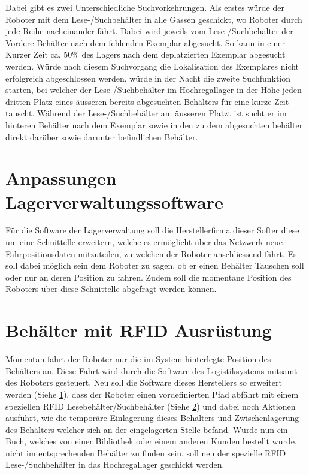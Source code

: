 Dabei gibt es zwei Unterschiedliche Suchvorkehrungen. Als erstes würde der Roboter mit dem Lese-/Suchbehälter in alle Gassen geschickt, wo Roboter durch jede Reihe nacheinander fährt. Dabei wird jeweils vom Lese-/Suchbehälter der Vordere Behälter nach dem fehlenden Exemplar abgesucht. So kann in einer Kurzer Zeit ca. 50\% des Lagers nach dem deplatzierten Exemplar abgesucht werden. Würde nach diesem Suchvorgang die Lokalisation des Exemplares nicht erfolgreich abgeschlossen werden, würde in der Nacht die zweite Suchfunktion starten, bei welcher der Lese-/Suchbehälter im Hochregallager in der Höhe jeden dritten Platz eines äusseren bereits abgesuchten Behälters für eine kurze Zeit tauscht. Während der Lese-/Suchbehälter am äusseren Platzt ist sucht er im hinteren Behälter nach dem Exemplar sowie in den zu dem abgesuchten behälter direkt darüber sowie darunter befindlichen Behälter.

\section{Anpassungen Lagerverwaltungssoftware}
\label{sec:roboterSWAnpassung}
Für die Software der Lagerverwaltung soll die Herstellerfirma dieser Softer diese um eine Schnittelle erweitern, welche es ermöglicht über das Netzwerk neue Fahrpositionsdaten mitzuteilen, zu welchen der Roboter anschliessend fährt. Es soll dabei möglich sein dem Roboter zu sagen, ob er einen Behälter Tauschen soll oder nur an deren Position zu fahren. Zudem soll die momentane Position des Roboters über diese Schnittelle abgefragt werden können. 

\section{Behälter mit RFID Ausrüstung}
\label{sec:behaelterMitRFID}


Momentan fährt der Roboter nur die im System hinterlegte Position des Behälters an. Diese Fahrt wird durch die Software des Logistiksystems mitsamt des Roboters gesteuert. Neu soll die Software dieses Herstellers so erweitert werden (Siehe \ref{sec:roboterSWAnpassung}), dass der Roboter einen vordefinierten Pfad abfährt mit einem speziellen RFID Lesebehälter/Suchbehälter (Siehe \ref{sec:behaelterMitRFID}) und dabei noch Aktionen ausführt, wie die temporäre Einlagerung dieses Behälters und Zwischenlagerung des Behälters welcher sich an der eingelagerten Stelle befand.
Würde nun ein Buch, welches von einer Bibliothek oder einem anderen Kunden bestellt wurde, nicht im entsprechenden Behälter zu finden sein, soll neu der spezielle RFID Lese-/Suchbehälter in das Hochregallager geschickt werden.


